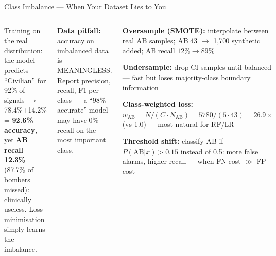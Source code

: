 \documentclass[aspectratio=169,10pt,t]{beamer}
\begin{document}
\begin{frame}{Class Imbalance --- When Your Dataset Lies to You}
\begin{columns}[T]
\begin{wbox}\scriptsize Training on the real distribution: the model predicts ``Civilian'' for 92\% of signals $\to$ 78.4\%+14.2\% = \textbf{92.6\% accuracy}, yet \textbf{AB recall = 12.3\%} (87.7\% of bombers missed): clinically useless. Loss minimisation simply learns the imbalance.\end{wbox}
\begin{ibox}\scriptsize \textbf{Data pitfall:} accuracy on imbalanced data is MEANINGLESS. Report precision, recall, F1 per class --- a ``98\% accurate'' model may have 0\% recall on the most important class.\end{ibox}
\begin{tl}\item \textbf{Oversample (SMOTE):} interpolate between real AB samples; AB 43 $\to$ 1,700 synthetic added; AB recall $12\%\to89\%$\item \textbf{Undersample:} drop CI samples until balanced --- fast but loses majority-class boundary information\item \textbf{Class-weighted loss:} $w_\text{AB}=N/(C\cdot N_\text{AB})=5780/(5\cdot43)=\mathbf{26.9\times}$ (vs 1.0) --- most natural for RF/LR\item \textbf{Threshold shift:} classify AB if $P(\text{AB}|x)>0.15$ instead of 0.5: more false alarms, higher recall --- when FN cost $\gg$ FP cost\end{tl}
\end{columns}
\end{frame}
\end{document}
